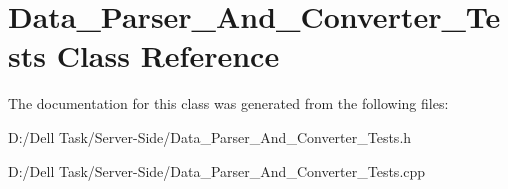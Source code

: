 \hypertarget{class_data___parser___and___converter___tests}{}\section{Data\+\_\+\+Parser\+\_\+\+And\+\_\+\+Converter\+\_\+\+Tests Class Reference}
\label{class_data___parser___and___converter___tests}


The documentation for this class was generated from the following files\+:\begin{DoxyCompactItemize}
\item 
D\+:/\+Dell Task/\+Server-\/\+Side/Data\+\_\+\+Parser\+\_\+\+And\+\_\+\+Converter\+\_\+\+Tests.\+h\item 
D\+:/\+Dell Task/\+Server-\/\+Side/Data\+\_\+\+Parser\+\_\+\+And\+\_\+\+Converter\+\_\+\+Tests.\+cpp\end{DoxyCompactItemize}
